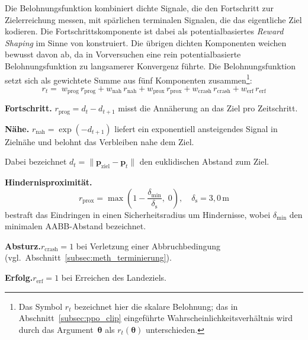 Die Belohnungsfunktion kombiniert dichte Signale, die den Fortschritt
zur Zielerreichung messen, mit spärlichen terminalen Signalen, die das
eigentliche Ziel kodieren. Die Fortschrittskomponente ist dabei als
potentialbasiertes \textit{Reward Shaping} im Sinne von
\textcite{ngPolicyInvarianceReward1999} konstruiert.
Die übrigen dichten Komponenten weichen bewusst davon ab, da in
Vorversuchen eine rein potentialbasierte Belohnungsfunktion zu
langsamerer Konvergenz führte. Die Belohnungsfunktion
setzt sich als gewichtete Summe aus fünf Komponenten zusammen\footnote{Das
Symbol $r_t$ bezeichnet hier die skalare Belohnung; das in
Abschnitt~\ref{subsec:ppo_clip} eingeführte
Wahrscheinlichkeitsverhältnis wird durch das Argument~$\boldsymbol{\theta}$
als $r_t(\boldsymbol{\theta})$ unterschieden.}:
\begin{equation} \label{eq:meth_reward}
  r_t =\;
    w_{\mathrm{prog}}\, r_{\mathrm{prog}}
  + w_{\mathrm{nah}}\, r_{\mathrm{nah}}
  + w_{\mathrm{prox}}\, r_{\mathrm{prox}}
  + w_{\mathrm{crash}}\, r_{\mathrm{crash}}
  + w_{\mathrm{erf}}\, r_{\mathrm{erf}}
\end{equation}


\noindent\textbf{Fortschritt.}\enspace
$r_{\mathrm{prog}} = d_t - d_{t+1}$ misst die Annäherung an das Ziel pro
Zeitschritt.

\noindent\textbf{Nähe.}\enspace
$r_{\mathrm{nah}} = \exp(-d_{t+1})$ liefert ein exponentiell ansteigendes
Signal in Zielnähe und belohnt das Verbleiben nahe dem Ziel.

Dabei bezeichnet $d_t = \lVert\mathbf{p}_{\mathrm{ziel}} - \mathbf{p}_t\rVert$
den euklidischen Abstand zum Ziel.

\noindent\textbf{Hindernisproximität.}\enspace
\begin{equation} \label{eq:meth_proximity}
  r_{\mathrm{prox}} = \max\!\left(1 - \frac{\delta_{\mathrm{min}}}{\delta_{\mathrm{s}}},\; 0\right),
  \quad \delta_{\mathrm{s}} = 3{,}0\,\text{m}
\end{equation}
bestraft das Eindringen in einen Sicherheitsradius um Hindernisse, wobei
$\delta_{\mathrm{min}}$ den minimalen AABB-Abstand bezeichnet.

\noindent\textbf{Absturz.}\enspace $r_{\mathrm{crash}} = 1$ bei Verletzung
einer Abbruchbedingung
(vgl.\ Abschnitt~\ref{subsec:meth_terminierung}).

\noindent\textbf{Erfolg.}\enspace $r_{\mathrm{erf}} = 1$ bei Erreichen des
Landeziels.

